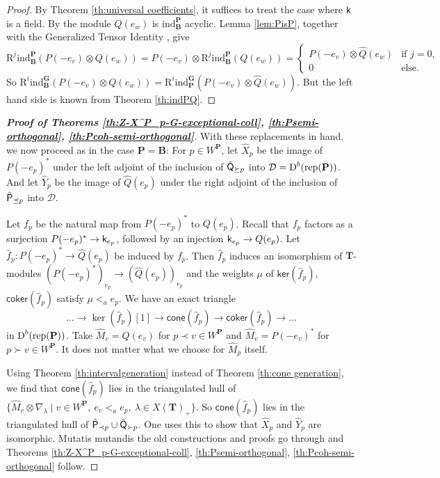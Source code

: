 \documentclass[sn-mathphys-num]{sn-jnl}%
\newcommand{\D}{\mathcal D}
\newcommand{\RR}{\mathrm R}
\newcommand{\rep}{{\mathrm{rep}}}
\newcommand{\ind}{{\mathrm{ind}}}
\newcommand*{\Dd}{\mathop{\mathrm D\kern0pt}\nolimits}
\newcommand{\coker}{{\mathsf{coker}}}
\newcommand{\cone}{{\mathsf{cone}}}
\newcommand{\kernel}{{\mathsf{ker}}}
\newcommand{\sk}{{\sf k}}
\newcommand{\bg}{\mathbf G}
\newcommand{\fb}{\mathbf B}
\newcommand{\bt}{\mathbf T}
\newcommand{\bp}{\mathbf P}
\def\text#1{\mbox{#1}}
\theoremstyle{definition}
\begin{document}
\begin{proof}By Theorem \ref{th:universal coefficients}, it suffices to treat the case where $\sk$ is a field.
By \cite[Theorem 1.9.(a)(ii)]{WvdK} the module $Q(e_w)$ is $\ind_\fb^\bp$ acyclic. Lemma \ref{lem:PisP}, together with the Generalized Tensor Identity \cite[I Proposition 4.8]{Jan}, give
$$\RR^j\ind_\fb^\bp (P(-e_v)\otimes Q(e_w))=P(-e_v)\otimes\RR^j\ind_\fb^\bp ( Q(e_w))=\begin{cases}P(-e_v)\otimes\hat  Q(e_w)&\text{if $j=0$,}\\
0&\text{else.}\end{cases}$$
So
$\RR^i\ind_\fb^\bg (P(-e_v)\otimes  Q(e_w))=\RR^i\ind_\bp^\bg (P(-e_v)\otimes \hat Q(e_w))$.
But the left hand side is known from Theorem \ref{th:indPQ}.
\end{proof}
\begin{proof}[\rm \bf Proof of Theorems \ref{th:Z-X^P_p-G-exceptional-coll},  \ref{th:Psemi-orthogonal}, \ref{th:Pcoh-semi-orthogonal}]
    

With these replacements in hand, we now proceed as in the case $\bp=\fb$:
For $p\in W^\bp$, let $\hat X_p$ be the image of $P(-e_p)^*$ under the left adjoint of the inclusion of $\hat{\sf Q}_{\succeq p}$ 
into $\D=\Dd ^b(\rep( \bp))$. 
And let $\hat Y_p$ be the image of $\hat Q(e_p)$ under the 
right adjoint of the inclusion of
$\hat{\sf P}_{\preceq p}$ into $\D$. 

Let $f_p$ be the natural map from $P(-e_p)^*$ to $Q(e_p)$. Recall that $f_p$ factors as a surjection $P(-e_p)^*\to\sk_{e_p}$, followed by an injection $\sk_{e_p}\to Q(e_p)$. Let $\hat f_p:P(-e_p)^*\to \hat Q(e_p)$ be induced by $f_p$. Then $\hat f_p$ induces an isomorphism of $\bt$-modules 
$(P(-e_p)^*)_{e_p}\to (\hat Q(e_p))_{e_p}$ and the weights $\mu$ of $\kernel (\hat f_p)$, $\coker(\hat f_p)$ satisfy $\mu<_a e_p$.
We have an exact triangle 
$$\dots \rightarrow \ker(\hat f_p)[1]\to \cone(\hat f_p)\to \coker(\hat f_p)\rightarrow \dots$$ in $\Dd ^b(\rep( \bp))$.
Take $\hat M_v=Q(e_v)$ for $p\prec v\in W^\bp$ and $\hat M_v=P(-e_v)^*$ for  $p\succ v\in W^\bp$. It does not matter what we choose for $\hat M_p$ itself.

Using Theorem \ref{th:intervalgeneration} instead of Theorem \ref{th:cone generation}, we find that 
$\cone(\hat f_p)$ lies in the triangulated hull of $\{\hat M_v\otimes \nabla_\lambda \mid v\in W^\bp,\ e_v <_a e_p,\ \lambda\in X(\bt)_+\}$. 
So $\cone(\hat f_p)$ lies in the triangulated hull of $\hat{\sf P}_{\prec p}\cup\hat{\sf Q}_{\succ p}$.
One uses this to show that $\hat X_p$ and $\hat Y_p$ are isomorphic.
Mutatis mutandis the old constructions and proofs go through and 
Theorems \ref{th:Z-X^P_p-G-exceptional-coll}, \ref{th:Psemi-orthogonal}, \ref{th:Pcoh-semi-orthogonal} follow.
\end{proof}
\end{document}

